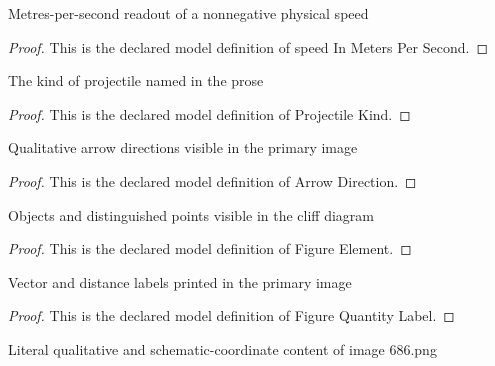 \begin{definition}
  \label{def:physics:phyx-mini-0686:phyxminiproblems-problemphyxmini0686-speedinmeterspersecond}
  Metres-per-second readout of a nonnegative physical speed
\end{definition}
\begin{proof}
  This is the declared model definition of speed In Meters Per Second.
\end{proof}
\begin{definition}
  \label{def:physics:phyx-mini-0686:phyxminiproblems-problemphyxmini0686-projectilekind}
  The kind of projectile named in the prose
\end{definition}
\begin{proof}
  This is the declared model definition of Projectile Kind.
\end{proof}
\begin{definition}
  \label{def:physics:phyx-mini-0686:phyxminiproblems-problemphyxmini0686-arrowdirection}
  Qualitative arrow directions visible in the primary image
\end{definition}
\begin{proof}
  This is the declared model definition of Arrow Direction.
\end{proof}
\begin{definition}
  \label{def:physics:phyx-mini-0686:phyxminiproblems-problemphyxmini0686-figureelement}
  Objects and distinguished points visible in the cliff diagram
\end{definition}
\begin{proof}
  This is the declared model definition of Figure Element.
\end{proof}
\begin{definition}
  \label{def:physics:phyx-mini-0686:phyxminiproblems-problemphyxmini0686-figurequantitylabel}
  Vector and distance labels printed in the primary image
\end{definition}
\begin{proof}
  This is the declared model definition of Figure Quantity Label.
\end{proof}
\begin{definition}
  \label{def:physics:phyx-mini-0686:phyxminiproblems-problemphyxmini0686-cliffprojectilefigure}
  Literal qualitative and schematic-coordinate content of image 686.png
\end{definition}
